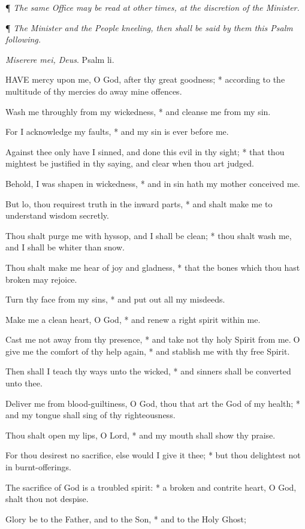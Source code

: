 ¶ \emph{The same Office
may be read at other times, at the discretion of the Minister.}

¶ \emph{The Minister
and the People kneeling, then shall be said by them this Psalm following.}

\emph{Miserere mei, Deus}. Psalm li.

HAVE mercy upon me, O God,
after thy great goodness; * according to the multitude of thy mercies
do away mine offences.

Wash me throughly from my wickedness, * and cleanse
me from my sin.

For I acknowledge my faults, * and my sin is ever before
me.

Against thee only have I sinned, and done this evil
in thy sight; * that thou mightest be justified in thy saying, and clear
when thou art judged.

Behold, I was shapen in wickedness, * and in sin hath
my mother conceived me.

But lo, thou requirest truth in the inward parts, *
and shalt make me to understand wisdom secretly.

Thou shalt purge me with hyssop, and I shall be clean;
* thou shalt wash me, and I shall be whiter than snow.

Thou shalt make me hear of joy and gladness, * that
the bones which thou hast broken may rejoice.

Turn thy face from my sins, * and put out all my misdeeds.

Make me a clean heart, O God, * and renew a right spirit
within me.

Cast me not away from thy presence, * and take not
thy holy Spirit from me.O give me the comfort of thy help again, * and
stablish me with thy free Spirit.

Then shall I teach thy ways unto the wicked, * and
sinners shall be converted unto thee.

Deliver me from blood-guiltiness, O God, thou that
art the God of my health; * and my tongue shall sing of thy righteousness.

Thou shalt open my lips, O Lord, * and my mouth shall
show thy praise.

For thou desirest no sacrifice, else would I give it
thee; * but thou delightest not in burnt-offerings.

The sacrifice of God is a troubled spirit: * a broken
and contrite heart, O God, shalt thou not despise.

Glory be to the Father, and to the Son, * and to the
Holy Ghost;

